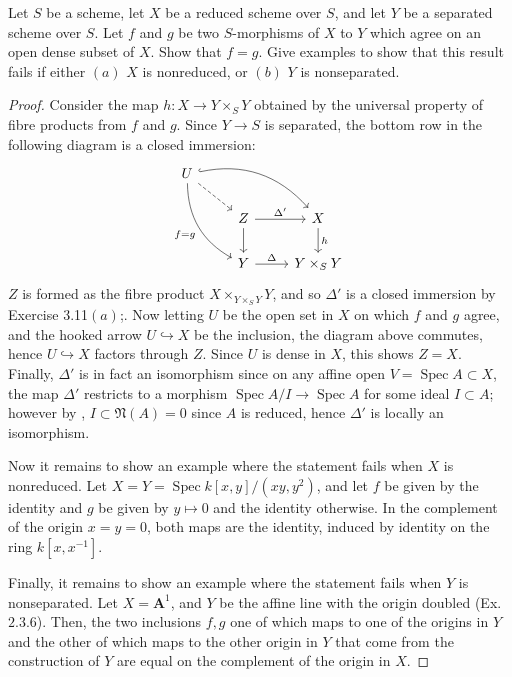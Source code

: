 \documentclass[10pt]{article}
\theoremstyle{definition}
\theoremstyle{remark}
\numberwithin{equation}{section}
\numberwithin{figure}{subsubsection}
\DeclareMathOperator{\Spec}{Spec}
\begin{document}
\begin{problem}
  Let $S$ be a scheme, let $X$ be a reduced scheme over $S$, and let $Y$ be a
  separated scheme over $S$. Let $f$ and $g$ be two $S$-morphisms of $X$ to $Y$
  which agree on an open dense subset of $X$. Show that $f = g$. Give examples
  to show that this result fails if either $(a)$ $X$ is nonreduced, or $(b)$ $Y$
  is nonseparated.
\end{problem}
\begin{proof}
  Consider the map $h \colon X \to Y \times_S Y$ obtained by the universal
  property of fibre products from $f$ and $g$. Since $Y \to S$ is separated, the
  bottom row in the following diagram is a closed immersion:
  \begin{equation*}
    \begin{tikzcd}
      U\arrow[bend left,hook]{drr}\arrow[bend right]{ddr}[swap]{f = g}
      \arrow[dashed]{dr}\\
      & Z \rar{\Delta'}\dar & X\dar{h}\\
      & Y \rar{\Delta} & Y \times_S Y
    \end{tikzcd}
  \end{equation*}
  $Z$ is formed as the fibre product $X \times_{Y \times_S Y} Y$, and so
  $\Delta'$ is a closed immersion by Exercise 3.11$(a)$;. Now letting $U$
  be the open set in $X$ on which $f$ and $g$ agree, and the hooked arrow $U
  \hookrightarrow X$ be the inclusion, the diagram above commutes, hence $U
  \hookrightarrow X$ factors through $Z$. Since $U$ is dense in $X$, this shows
  $Z = X$. Finally, $\Delta'$ is in fact an isomorphism since on any affine open
  $V = \Spec A \subset X$, the map $\Delta'$ restricts to a morphism $\Spec A/I
  \to \Spec A$ for some ideal $I \subset A$; however by \cite[Exc.\
  1.21v]{AM69}, $I \subset \mathfrak{N}(A) = 0$ since
  $A$ is reduced, hence $\Delta'$ is locally an isomorphism.
  \par Now it remains to show an example where the statement fails when $X$ is
  nonreduced. Let $X = Y = \Spec k[x,y]/(xy,y^2)$, and let $f$ be given
  by the identity and $g$ be given by $y \mapsto 0$ and the identity otherwise.
  In the complement of the origin $x=y=0$, both maps are the identity, induced
  by identity on the ring $k[x,x^{-1}]$.
  \par Finally, it remains to show an example where the statement fails when $Y$
  is nonseparated. Let $X = \mathbf{A}^1$, and $Y$ be the affine line with the
  origin doubled (Ex.\ $2.3.6$). Then, the two inclusions $f,g$ one of which
  maps to one of the origins in $Y$ and the other of which maps to the other
  origin in $Y$ that come from the construction of $Y$ are equal on the complement
  of the origin in $X$.
\end{proof}
\end{document}
